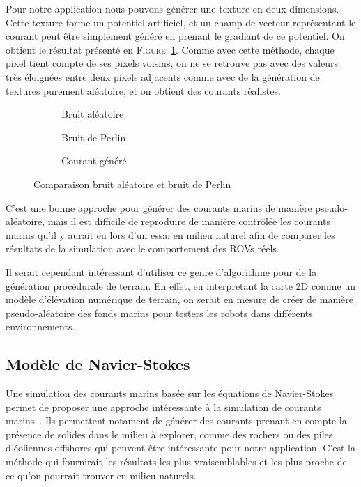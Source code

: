 				Pour notre application nous pouvons générer une texture en deux dimensions. Cette texture forme un potentiel artificiel, et un champ de vecteur représentant le courant peut être simplement généré en prenant le gradiant de ce potentiel. On obtient le résultat présenté en \textsc{Figure}~\ref{fig:perlin_noise}. Comme avec cette méthode, chaque pixel tient compte de ses pixels voisins, on ne se retrouve pas avec des valeurs très éloignées entre deux pixels adjacents comme avec de la génération de textures purement aléatoire, et on obtient des courants réalistes.

				\begin{figure}[!htb]
					\centering
					\begin{subfigure}[b]{0.32\textwidth}
						\centering
						\caption{Bruit aléatoire}
					\end{subfigure}
					\hfill
					\begin{subfigure}[b]{0.32\textwidth}
						\centering
						\caption{Bruit de Perlin}
					\end{subfigure}
					\hfill
					\begin{subfigure}[b]{0.32\textwidth}
						\centering
						\caption{Courant généré}
					\end{subfigure}
					\caption{Comparaison bruit aléatoire et bruit de Perlin}
					\label{fig:perlin_noise}
				\end{figure}

				C'est une bonne approche pour générer des courants marins de manière pseudo-aléatoire, mais il est difficile de reproduire de manière contrôlée les courants marins qu'il y aurait eu lors d'un essai en milieu naturel afin de comparer les résultats de la simulation avec le comportement des \gls{ROV}s réels.
				
				Il serait cependant intéressant d'utiliser ce genre d'algorithme pour de la génération procédurale de terrain. En effet, en interpretant la carte 2D comme un modèle d'élévation numérique de terrain, on serait en mesure de créer de manière pseudo-aléatoire des fonds marins pour testers les robots dans différents environnements.

			\subsection{Modèle de Navier-Stokes}

				Une simulation des courants marins basée sur les équations de Navier-Stokes permet de proposer une approche intéressante à la simulation de courants marins~\cite{Garau2006current}. Ils permettent notament de générer des courants prenant en compte la présence de solides dans le milieu à explorer, comme des rochers ou des piles d'éoliennes offshores qui peuvent être intéressante pour notre application. C'est la méthode qui fournirait les résultats les plus vraisemblables et les plus proche de ce qu'on pourrait trouver en milieu naturels.

